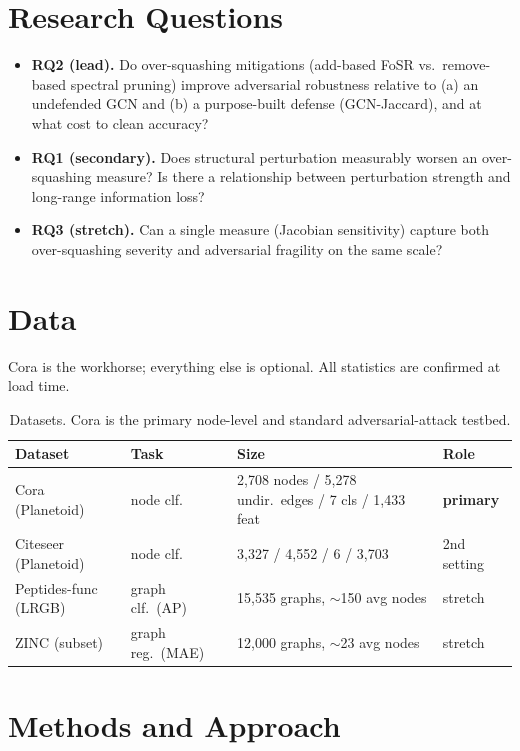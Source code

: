 \documentclass[10pt]{article}
\begin{document}
\section{Research Questions}
\begin{itemize}
  \item \textbf{RQ2 (lead).} Do over-squashing mitigations (add-based FoSR vs.\ remove-based spectral pruning)
  improve adversarial robustness relative to (a) an undefended GCN and (b) a purpose-built defense
  (GCN-Jaccard), and at what cost to clean accuracy?
  \item \textbf{RQ1 (secondary).} Does structural perturbation measurably worsen an over-squashing measure?
  Is there a relationship between perturbation strength and long-range information loss?
  \item \textbf{RQ3 (stretch).} Can a single measure (Jacobian sensitivity) capture both over-squashing
  severity and adversarial fragility on the same scale?
\end{itemize}

\section{Data}
Cora is the workhorse; everything else is optional. All statistics are confirmed at load time.

\begin{table}[h]
\centering\small
\begin{tabular}{@{}llll@{}}
\toprule
\textbf{Dataset} & \textbf{Task} & \textbf{Size} & \textbf{Role} \\
\midrule
Cora (Planetoid)     & node clf.         & 2{,}708 nodes / 5{,}278 undir.\ edges / 7 cls / 1{,}433 feat & \textbf{primary} \\
Citeseer (Planetoid) & node clf.         & 3{,}327 / 4{,}552 / 6 / 3{,}703                              & 2nd setting \\
Peptides-func (LRGB) & graph clf.\ (AP)  & 15{,}535 graphs, $\sim$150 avg nodes                         & stretch \\
ZINC (subset)        & graph reg.\ (MAE) & 12{,}000 graphs, $\sim$23 avg nodes                          & stretch \\
\bottomrule
\end{tabular}
\caption{Datasets. Cora is the primary node-level and standard adversarial-attack testbed.}
\end{table}

\section{Methods and Approach}
\end{document}

